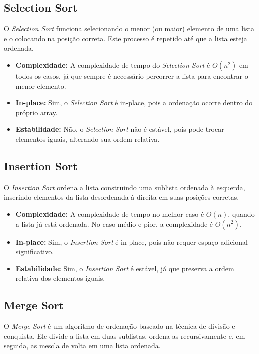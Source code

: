\documentclass[a4paper,12pt]{article}
\begin{document}
\subsection{Selection Sort}
O \textit{Selection Sort} funciona selecionando o menor (ou maior) elemento de uma lista e o colocando na posição correta. Este processo é repetido até que a lista esteja ordenada.

\begin{itemize}
    \item \textbf{Complexidade:} A complexidade de tempo do \textit{Selection Sort} é $O(n^2)$ em todos os casos, já que sempre é necessário percorrer a lista para encontrar o menor elemento.
    \item \textbf{In-place:} Sim, o \textit{Selection Sort} é in-place, pois a ordenação ocorre dentro do próprio array.
    \item \textbf{Estabilidade:} Não, o \textit{Selection Sort} não é estável, pois pode trocar elementos iguais, alterando sua ordem relativa.
\end{itemize}

\subsection{Insertion Sort}
O \textit{Insertion Sort} ordena a lista construindo uma sublista ordenada à esquerda, inserindo elementos da lista desordenada à direita em suas posições corretas.

\begin{itemize}
    \item \textbf{Complexidade:} A complexidade de tempo no melhor caso é $O(n)$, quando a lista já está ordenada. No caso médio e pior, a complexidade é $O(n^2)$.
    \item \textbf{In-place:} Sim, o \textit{Insertion Sort} é in-place, pois não requer espaço adicional significativo.
    \item \textbf{Estabilidade:} Sim, o \textit{Insertion Sort} é estável, já que preserva a ordem relativa dos elementos iguais.
\end{itemize}

\subsection{Merge Sort}
O \textit{Merge Sort} é um algoritmo de ordenação baseado na técnica de divisão e conquista. Ele divide a lista em duas sublistas, ordena-as recursivamente e, em seguida, as mescla de volta em uma lista ordenada.
\end{document}
